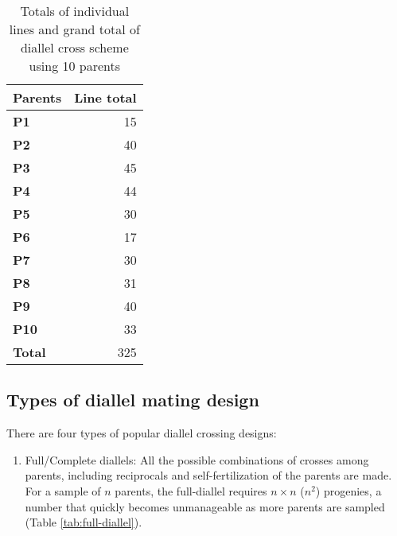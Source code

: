 \documentclass[nofonts,]{tufte-handout}
\providecommand{\tightlist}{%
  \setlength{\itemsep}{0pt}\setlength{\parskip}{0pt}}
\begin{document}
\begin{table}[t]

\caption{\label{tab:sum-over-ind}Totals of individual lines and grand total of diallel cross
 scheme using 10 parents}
\centering
\fontsize{10}{12}\selectfont
\begin{tabular}{>{\bfseries}lr}
\toprule
Parents & Line total\\
\midrule
\rowcolor{gray!6}  P1 & 15\\
P2 & 40\\
\rowcolor{gray!6}  P3 & 45\\
P4 & 44\\
\rowcolor{gray!6}  P5 & 30\\
\addlinespace
P6 & 17\\
\rowcolor{gray!6}  P7 & 30\\
P8 & 31\\
\rowcolor{gray!6}  P9 & 40\\
P10 & 33\\
\addlinespace
\rowcolor{gray!6}  Total & 325\\
\bottomrule
\end{tabular}
\end{table}

\hypertarget{types-of-diallel-mating-design}{%
\subsection{Types of diallel mating
design}\label{types-of-diallel-mating-design}}

There are four types of popular diallel crossing designs:

\begin{enumerate}
\def\labelenumi{\arabic{enumi}.}
\tightlist
\item
  Full/Complete diallels: All the possible combinations of crosses among
  parents, including reciprocals and self-fertilization of the parents
  are made. For a sample of \(n\) parents, the full-diallel requires
  \(n \times n\) (\(n^2\)) progenies, a number that quickly becomes
  unmanageable as more parents are sampled (Table
  \ref{tab:full-diallel}).
\end{enumerate}

\begingroup\fontsize{8}{10}\selectfont
\end{document}
